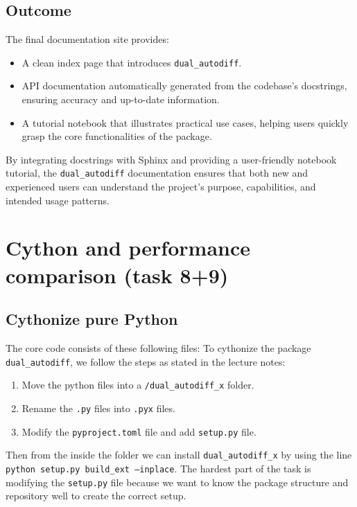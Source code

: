 \documentclass[12.5pt]{article}
\begin{document}
\subsection*{Outcome}

The final documentation site provides:
\begin{itemize}
    \item A clean index page that introduces \texttt{dual\_autodiff}.
    \item API documentation automatically generated from the codebase's docstrings, ensuring accuracy and up-to-date information.
    \item A tutorial notebook that illustrates practical use cases, helping users quickly grasp the core functionalities of the package.
\end{itemize}

By integrating docstrings with Sphinx and providing a user-friendly notebook tutorial, the \texttt{dual\_autodiff} documentation ensures that both new and experienced users can understand the project's purpose, capabilities, and intended usage patterns.

\newpage

\section{Cython and performance comparison (task 8+9)}
\subsection{Cythonize pure Python}
The core code consists of these following files: 
\vspace{0.5cm}
\vspace{0.5cm} 
To cythonize the package \texttt{dual\_autodiff}, we follow the steps as stated in the lecture notes:
\begin{enumerate}
    \item Move the python files into a \texttt{/dual\_autodiff\_x} folder.
    \item Rename the \texttt{.py} files into \texttt{.pyx} files.
    \item Modify the \texttt{pyproject.toml} file and add \texttt{setup.py} file.
\end{enumerate}

Then from the inside the folder we can install \texttt{dual\_autodiff\_x} by using the line 
\newline \texttt{python setup.py build\_ext --inplace}. The hardest part of the task is modifying the \texttt{setup.py} file because we want to know the package structure and repository well to create the correct setup.
\end{document}
